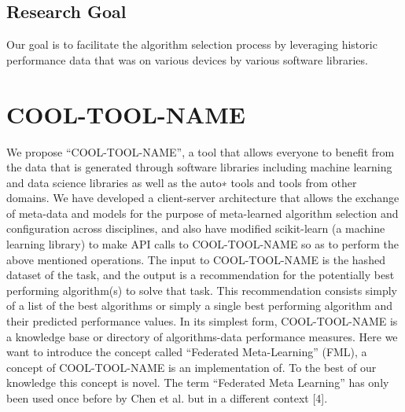 \documentclass{article}
\begin{document}
\subsection{Research Goal}
Our goal is to facilitate the algorithm selection process by leveraging historic performance data that was on various devices by various software libraries.


\section{COOL-TOOL-NAME}
We propose “COOL-TOOL-NAME”, a tool that allows everyone to benefit from the data that is generated through software libraries including machine learning and data science libraries as well as the auto∗ tools and tools from other domains. We have developed a client-server architecture that allows the exchange of meta-data and models for the purpose of meta-learned algorithm selection and configuration across disciplines, and also have modified scikit-learn (a machine learning library) to make API calls to COOL-TOOL-NAME so as to perform the above mentioned operations.
The input to COOL-TOOL-NAME is the hashed dataset of the task, and the output is a recommendation for the potentially best performing algorithm(s) to solve that task. This recommendation consists simply of a list of the best algorithms or simply a single best performing algorithm and their predicted performance values. In its simplest form, COOL-TOOL-NAME is a knowledge base or directory of algorithms-data performance measures. Here we want to introduce the concept called “Federated Meta-Learning” (FML), a concept of COOL-TOOL-NAME is an implementation of. To the best of our knowledge this concept is novel. The term “Federated Meta Learning” has only been used once before by Chen et al. but in a different context [4]. 






\end{document}
